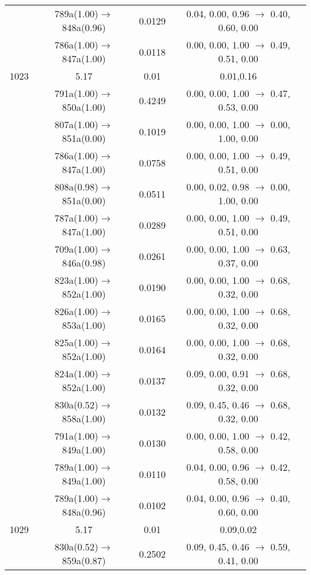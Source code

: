 \documentclass[10pt,a4paper]{article}
\begin{document}
\begin{longtable}{c|c|c|c}
 	& 789a(1.00)$\rightarrow$848a(0.96) &	 0.0129 &	 0.04, 0.00, 0.96 $\rightarrow$ 0.40, 0.60, 0.00 \\ 
 	& 786a(1.00)$\rightarrow$847a(1.00) &	 0.0118 &	 0.00, 0.00, 1.00 $\rightarrow$ 0.49, 0.51, 0.00 \\ 
 \hline1023 &	 5.17 &	 0.01 &	 0.01,0.16 \\ 
  	& 791a(1.00)$\rightarrow$850a(1.00) &	 0.4249 &	 0.00, 0.00, 1.00 $\rightarrow$ 0.47, 0.53, 0.00 \\ 
 	& 807a(1.00)$\rightarrow$851a(0.00) &	 0.1019 &	 0.00, 0.00, 1.00 $\rightarrow$ 0.00, 1.00, 0.00 \\ 
 	& 786a(1.00)$\rightarrow$847a(1.00) &	 0.0758 &	 0.00, 0.00, 1.00 $\rightarrow$ 0.49, 0.51, 0.00 \\ 
 	& 808a(0.98)$\rightarrow$851a(0.00) &	 0.0511 &	 0.00, 0.02, 0.98 $\rightarrow$ 0.00, 1.00, 0.00 \\ 
 	& 787a(1.00)$\rightarrow$847a(1.00) &	 0.0289 &	 0.00, 0.00, 1.00 $\rightarrow$ 0.49, 0.51, 0.00 \\ 
 	& 709a(1.00)$\rightarrow$846a(0.98) &	 0.0261 &	 0.00, 0.00, 1.00 $\rightarrow$ 0.63, 0.37, 0.00 \\ 
 	& 823a(1.00)$\rightarrow$852a(1.00) &	 0.0190 &	 0.00, 0.00, 1.00 $\rightarrow$ 0.68, 0.32, 0.00 \\ 
 	& 826a(1.00)$\rightarrow$853a(1.00) &	 0.0165 &	 0.00, 0.00, 1.00 $\rightarrow$ 0.68, 0.32, 0.00 \\ 
 	& 825a(1.00)$\rightarrow$852a(1.00) &	 0.0164 &	 0.00, 0.00, 1.00 $\rightarrow$ 0.68, 0.32, 0.00 \\ 
 	& 824a(1.00)$\rightarrow$852a(1.00) &	 0.0137 &	 0.09, 0.00, 0.91 $\rightarrow$ 0.68, 0.32, 0.00 \\ 
 	& 830a(0.52)$\rightarrow$858a(1.00) &	 0.0132 &	 0.09, 0.45, 0.46 $\rightarrow$ 0.68, 0.32, 0.00 \\ 
 	& 791a(1.00)$\rightarrow$849a(1.00) &	 0.0130 &	 0.00, 0.00, 1.00 $\rightarrow$ 0.42, 0.58, 0.00 \\ 
 	& 789a(1.00)$\rightarrow$849a(1.00) &	 0.0110 &	 0.04, 0.00, 0.96 $\rightarrow$ 0.42, 0.58, 0.00 \\ 
 	& 789a(1.00)$\rightarrow$848a(0.96) &	 0.0102 &	 0.04, 0.00, 0.96 $\rightarrow$ 0.40, 0.60, 0.00 \\ 
 \hline1029 &	 5.17 &	 0.01 &	 0.09,0.02 \\ 
  	& 830a(0.52)$\rightarrow$859a(0.87) &	 0.2502 &	 0.09, 0.45, 0.46 $\rightarrow$ 0.59, 0.41, 0.00 \\ 

\end{longtable}
\end{document}
